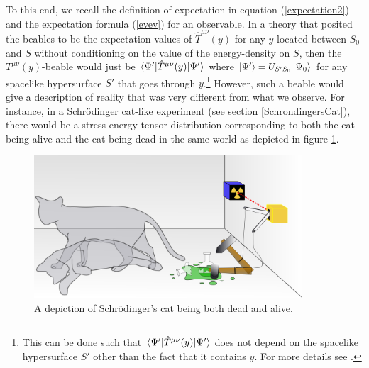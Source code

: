 To this end, we recall the definition of expectation in equation (\ref{expectation2}) and the expectation formula (\ref{evev}) for an observable. In a theory that posited the beables to be the expectation values of $\hat{T}^{\mu\nu}(y)$ for any $y$ located between $S_0$ and $S$  without conditioning on the value of the energy-density on $S$, then the $T^{\mu\nu}(y)$-beable would just be $\ev*{\hat{T}^{\mu\nu}(y)}{\Psi'}$ where $\ket{\Psi'}=U_{S'S_0}\ket{\Psi_0}$ for any spacelike hypersurface $S'$ that goes through $y$.\footnote{This can be done such that $\ev*{\hat{T}^{\mu\nu}(y)}{\Psi'}$ does not depend on the spacelike hypersurface $S'$ other than the fact that it contains $y$. For more details see \cite{SchwingerJulianI}.} However, such a beable would give a description of reality that was very different from what we observe. For instance, in a Schr\"{o}dinger cat-like experiment (see section \ref{SchrondingersCat}), there would be a stress-energy tensor distribution corresponding to both the cat being alive and the cat being dead in the same world as depicted in figure \ref{deadlivecat}.
\begin{figure}[ht!]
  \captionsetup{justification=justified}
  \centering
  \includegraphics[width=100mm]{Chapter03/Schrodingers_cat.png}
  \caption[Caption for LOF]{A depiction of Schr\"{o}dinger's cat being both dead and alive.\protect\footnotemark}
  \label{deadlivecat}
  \end{figure}
